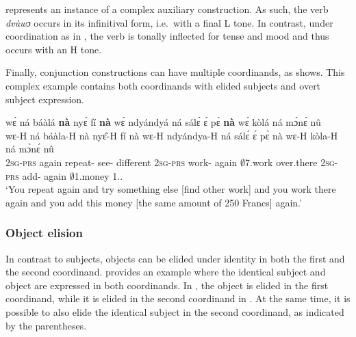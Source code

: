 \noindent {} represents an instance of a complex auxiliary construction. As such, the verb {\itshape dvùwɔ} occurs in its infinitival form, i.e.\ with a final L tone. In contrast, under coordination as in , the verb is tonally inflected for tense and mood and thus occurs with an H tone.


Finally, conjunction constructions can have multiple coordinands, as  shows. This complex example contains both coordinands with elided subjects and overt subject expression.


\ea\label{Coord8} 
  \glll wɛ́ ná báàlá {\bfseries nà} nyɛ́ fí {\bfseries nà} wɛ́ ndyándyá ná sálɛ́ ɛ́ pɛ̀ {\bfseries nà} wɛ́ kòlá ná mɔ̀nɛ́ nû\\
      wɛ-H ná báàla-H nà nyɛ̂-H fí nà wɛ-H ndyándya-H ná sálɛ́ ɛ́ pɛ̀ nà wɛ-H kòla-H ná mɔ̀nɛ́ nû\\
         2\textsc{sg}-\textsc{prs} again repeat-{\R} {\CONJ} see-{\R} different {\CONJ} 2\textsc{sg}-\textsc{prs} work-{\R} again $\emptyset$7.work {\LOC} over.there {\CONJ} 2\textsc{sg}-\textsc{prs} add-{\R} again $\emptyset$1.money 1.{\DEM}.{\PROX} \\
    \trans `You repeat again and try something else [find other work] and you work there again and you add this money [the same amount of 250 Francs] again.'
\z

\subsubsection*{Object elision} In contrast to subjects, objects can be elided under identity in both the first and the second coordinand.  provides an example where the identical subject and object are expressed in both coordinands. In , the object is elided in the first coordinand, while it is elided in the second coordinand in . At the same time, it is possible to also elide the identical subject in the second coordinand, as indicated by the parentheses.



